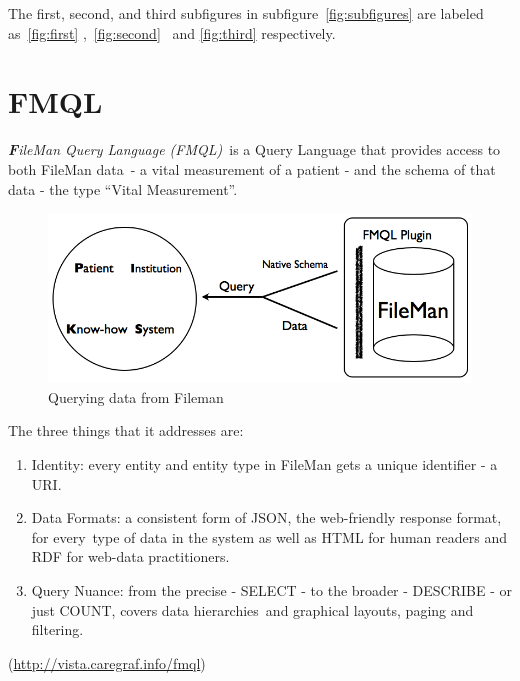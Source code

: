\documentclass[DIV=calc, paper=a4, fontsize=12pt, onecolumn]{scrartcl}	 %
\newcommand{\initial}[1]{ %
\lettrine[lines=3,lhang=0.3,nindent=0em,slope=0em]{
\color{DarkBlue}
{\textbf{\textit{#1}}}}{}}
\begin{document}
  \noindent The first, second, and third subfigures in subfigure\
  \ref{fig:subfigures} are labeled as\
  \ref{fig:first} \cite{stenzhorn2008simplifying},\
  \ref{fig:second} \cite{stenzhorn2008simplifying}\
  and \ref{fig:third}  \cite{parachuri2008role} respectively.\\



  \section[FileMan Query Language (FMQL)]{FMQL}
  \label{sec:fmql}

  \initial{F}\textit{ileMan Query Language (FMQL)}\
  is a Query Language that provides access to both FileMan data\
  - a vital measurement of a patient - and the schema of that data - the type ``Vital Measurement''.\\
  
  \begin{figure}[ht!]
    \centering
    \includegraphics[scale=0.4]{fmqlFromFileMan.png}
    \caption{Querying data from Fileman~\cite[Fig.~1]{belleau_bio2rdf:_2008}}
    \label{fig:fmql}
  \end{figure}  

  \noindent The three things that it addresses are:
  \begin{enumerate}
    \item Identity: every entity and entity type in FileMan gets a unique identifier - a URI.
    \item Data Formats: a consistent form of JSON, the web-friendly response format, for every\
    type of data in the system as well as HTML for human readers and RDF for web-data practitioners.\
    \item Query Nuance: from the precise - SELECT - to the broader - DESCRIBE - or just COUNT, covers data hierarchies\
    and graphical layouts, paging and filtering.
  \end{enumerate}
  (\url{http://vista.caregraf.info/fmql})
\end{document}
